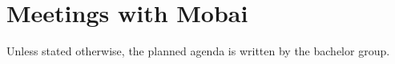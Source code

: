 \chapter{Meetings with Mobai}

Unless stated otherwise, the planned agenda is written by the bachelor group.

